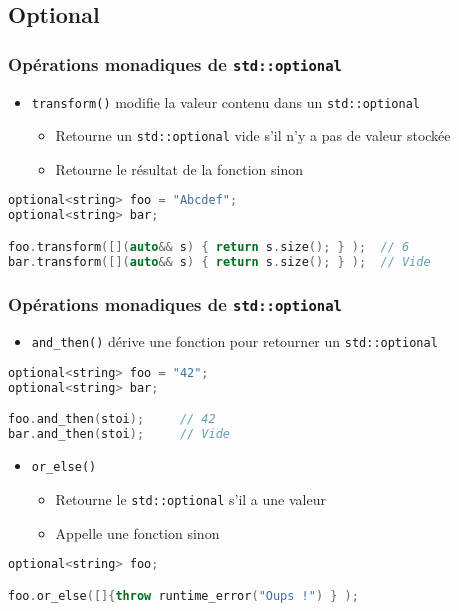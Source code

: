 \documentclass[C++.tex]{subfiles}
\begin{document}
\subsection*{Optional}
\begin{frame}[fragile]
	\frametitle{Opérations monadiques de \lstinline|std::optional|}
	\begin{itemize}
		\item \lstinline|transform()| modifie la valeur contenu dans un \lstinline|std::optional|


		\begin{itemize}
			\item Retourne un \lstinline|std::optional| vide s'il n'y a pas de valeur stockée
			\item Retourne le résultat de la fonction sinon
		\end{itemize}
	\end{itemize}

	\begin{lstlisting}[language=C++]
optional<string> foo = "Abcdef";
optional<string> bar;

foo.transform([](auto&& s) { return s.size(); } );	// 6
bar.transform([](auto&& s) { return s.size(); } );  // Vide\end{lstlisting}
\end{frame}

\begin{frame}[fragile]
	\frametitle{Opérations monadiques de \lstinline|std::optional|}
	\begin{itemize}
		\item \lstinline|and_then()| dérive une fonction pour retourner un \lstinline|std::optional|
	\end{itemize}

	\begin{lstlisting}[language=C++]
optional<string> foo = "42";
optional<string> bar;

foo.and_then(stoi);		// 42
bar.and_then(stoi);		// Vide\end{lstlisting}

	\begin{itemize}
		\item \lstinline|or_else()| 
		\begin{itemize}
			\item Retourne le \lstinline|std::optional| s'il a une valeur
			\item Appelle une fonction sinon
		\end{itemize}
	\end{itemize}

	\begin{lstlisting}[language=C++]
optional<string> foo;

foo.or_else([]{throw runtime_error("Oups !") } );\end{lstlisting}
\end{frame}
\end{document}
